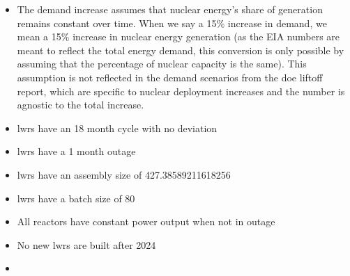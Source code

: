 \begin{itemize}
    \item The demand increase assumes that nuclear energy's share of generation remains constant over time. When we say a 15$\%$ increase in demand, we mean a 15$\%$ increase in nuclear energy generation (as the EIA numbers are meant to reflect the total energy demand, this conversion is only possible by assuming that the percentage of nuclear capacity is the same). This assumption is not reflected in the demand scenarios from the \gls{doe} liftoff report, which are specific to nuclear deployment increases and the number is agnostic to the total increase.
    \item \gls{lwr}s have an 18 month cycle with no deviation
    \item \gls{lwr}s have a 1 month outage
    \item \gls{lwr}s have an assembly size of 427.38589211618256
    \item \gls{lwr}s have a batch size of 80
    \item All reactors have constant power output when not in outage
    \item No new \gls{lwr}s are built after 2024
    \item 
\end{itemize}